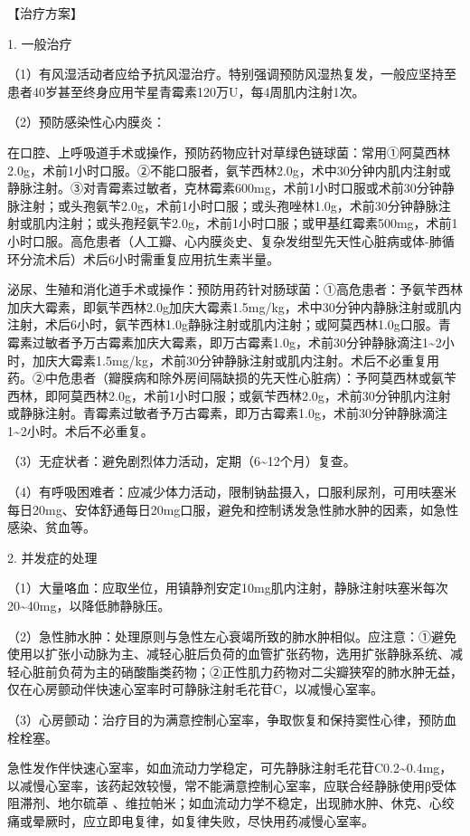 【治疗方案】

1. 一般治疗

（1）有风湿活动者应给予抗风湿治疗。特别强调预防风湿热复发，一般应坚持至患者40岁甚至终身应用苄星青霉素120万U，每4周肌内注射1次。

（2）预防感染性心内膜炎：

在口腔、上呼吸道手术或操作，预防药物应针对草绿色链球菌：常用①阿莫西林2.0g，术前1小时口服。②不能口服者，氨苄西林2.0g，术中30分钟内肌内注射或静脉注射。③对青霉素过敏者，克林霉素600mg，术前1小时口服或术前30分钟静脉注射；或头孢氨苄2.0g，术前1小时口服；或头孢唑林1.0g，术前30分钟静脉注射或肌内注射；或头孢羟氨苄2.0g，术前1小时口服；或甲基红霉素500mg，术前1小时口服。高危患者（人工瓣、心内膜炎史、复杂发绀型先天性心脏病或体-肺循环分流术后）术后6小时需重复应用抗生素半量。

泌尿、生殖和消化道手术或操作：预防用药针对肠球菌：①高危患者：予氨苄西林加庆大霉素，即氨苄西林2.0g加庆大霉素1.5mg/kg，术中30分钟内静脉注射或肌内注射，术后6小时，氨苄西林1.0g静脉注射或肌内注射；或阿莫西林1.0g口服。青霉素过敏者予万古霉素加庆大霉素，即万古霉素1.0g，术前30分钟静脉滴注1\textasciitilde{}2小时，加庆大霉素1.5mg/kg，术前30分钟静脉注射或肌内注射。术后不必重复用药。②中危患者（瓣膜病和除外房间隔缺损的先天性心脏病）：予阿莫西林或氨苄西林，即阿莫西林2.0g，术前1小时口服；或氨苄西林2.0g，术前30分钟肌内注射或静脉注射。青霉素过敏者予万古霉素，即万古霉素1.0g，术前30分钟静脉滴注1\textasciitilde{}2小时。术后不必重复。

（3）无症状者：避免剧烈体力活动，定期（6\textasciitilde{}12个月）复查。

（4）有呼吸困难者：应减少体力活动，限制钠盐摄入，口服利尿剂，可用呋塞米每日20mg、安体舒通每日20mg口服，避免和控制诱发急性肺水肿的因素，如急性感染、贫血等。

2. 并发症的处理

（1）大量咯血：应取坐位，用镇静剂安定10mg肌内注射，静脉注射呋塞米每次20\textasciitilde{}40mg，以降低肺静脉压。

（2）急性肺水肿：处理原则与急性左心衰竭所致的肺水肿相似。应注意：①避免使用以扩张小动脉为主、减轻心脏后负荷的血管扩张药物，选用扩张静脉系统、减轻心脏前负荷为主的硝酸酯类药物；②正性肌力药物对二尖瓣狭窄的肺水肿无益，仅在心房颤动伴快速心室率时可静脉注射毛花苷C，以减慢心室率。

（3）心房颤动：治疗目的为满意控制心室率，争取恢复和保持窦性心律，预防血栓栓塞。

急性发作伴快速心室率，如血流动力学稳定，可先静脉注射毛花苷C0.2\textasciitilde{}0.4mg，以减慢心室率，该药起效较慢，常不能满意控制心室率，应联合经静脉使用β受体阻滞剂、地尔硫䓬
、维拉帕米；如血流动力学不稳定，出现肺水肿、休克、心绞痛或晕厥时，应立即电复律，如复律失败，尽快用药减慢心室率。


